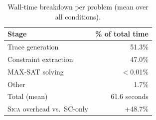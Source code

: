 \documentclass[11pt,a4paper]{article}
\newcommand{\sica}{\textsc{Sica}}
\begin{document}
\begin{table}[h]
\centering
\caption{Wall-time breakdown per problem (mean over all conditions).}
\small
\begin{tabular}{lr}
\toprule
Stage & \% of total time \\
\midrule
Trace generation & 51.3\% \\
Constraint extraction & 47.0\% \\
MAX-SAT solving & $<$0.01\% \\
Other & 1.7\% \\
\midrule
Total (mean) & 61.6 seconds \\
\sica{} overhead vs.\ SC-only & +48.7\% \\
\bottomrule
\end{tabular}
\end{table}
\end{document}
